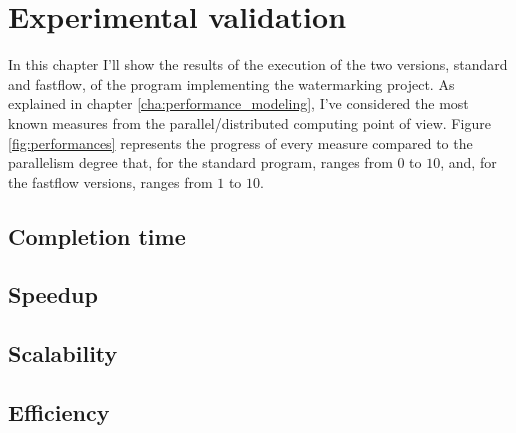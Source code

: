 \chapter{Experimental validation} %
\label{cha:experimental_validation}
    In this chapter I'll show the results of the execution of the two versions, standard and fastflow, of the
    program implementing the watermarking project. As explained in chapter \ref{cha:performance_modeling}, I've
    considered the most known measures from the parallel/distributed computing point of view. Figure
    \ref{fig:performances} represents the progress of every measure compared to the parallelism degree that, for
    the standard program, ranges from $0$ to $10$, and, for the fastflow versions, ranges from $1$ to $10$.
    \section{Completion time} %
    \label{sec:completion_time}

    \section{Speedup} %
    \label{sec:speedup}

    \section{Scalability} %
    \label{sec:scalability}

    \section{Efficiency} %
    \label{sec:efficiency}

